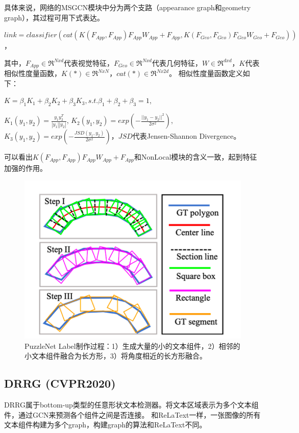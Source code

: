 具体来说，网络的MSGCN模块中分为两个支路（appearance graph和geometry graph），其过程可用下式表达。

$link = classifier(cat(K(F_{App},F_{App})F_{App}W_{App} + F_{App}, K(F_{Geo},F_{Geo})F_{Geo}W_{Geo} + F_{Geo}))$，

其中，$F_{App}\in \Re^{Nxd}$代表视觉特征，$F_{Geo}\in \Re^{Nxd}$代表几何特征，$W\in \Re^{dxd}$，$K$代表相似性度量函数，$K(*)\in \Re^{NxN}$，$cat(*)\in \Re^{Nx2d}$。
相似性度量函数定义如下：

$K = \beta_{1}K_{1} + \beta_{2}K_{2} + \beta_{3}K_{3}, s.t. \beta_{1} + \beta_{2} + \beta_{3} = 1$,

$K_{1}(y_{1}, y_{2}) = \frac{y_{1}y_{2}^{T}}{|y_{1}||y_{2}|}$,
$K_{2}(y_{1}, y_{2}) = exp(-\frac{||y_{1} - y_{2}||^{2}}{2\sigma^{2}})$,
$K_{3}(y_{1}, y_{2}) = exp(-\frac{JSD(y_{1} , y_{2})}{2\sigma^{2}})$，$JSD$代表Jensen-Shannon Divergence。

可以看出$K(F_{App},F_{App})F_{App}W_{App} + F_{App}$和NonLocal模块的含义一致，起到特征加强的作用。

\begin{figure}[H]
    \centering
    \includegraphics[width=.6\textwidth]{figure/detection/puzzlenet_gt.png} 
    \caption{PuzzleNet Label制作过程：1）生成大量的小的文本组件，2）相邻的小文本组件融合为长方形，3）将角度相近的长方形融合。} 
    \label{puzzlenet_gt} 
\end{figure}
\subsection{DRRG (CVPR2020)}
DRRG\cite{zhang2020deep}属于bottom-up类型的任意形状文本检测器。将文本区域表示为多个文本组件，通过GCN来预测各个组件之间是否连接。
和ReLaText一样，一张图像的所有文本组件构建为多个graph，构建graph的算法和ReLaText不同。

